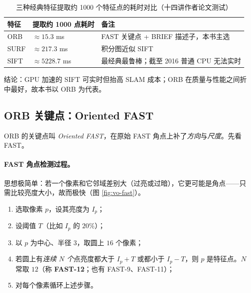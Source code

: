 \begin{table}[H]\centering\small
\caption{三种经典特征提取约 1000 个特征点的耗时对比（十四讲作者论文测试\cite{gaoxiang2019slam14}）}
\label{tab:vo-feature-time}
\begin{tabular}{lll}
\toprule
特征 & 提取约 1000 点耗时 & 备注 \\
\midrule
ORB  & $\approx 15.3$ ms & FAST 关键点 + BRIEF 描述子，本书主选 \\
SURF & $\approx 217.3$ ms & 积分图近似 SIFT \\
SIFT & $\approx 5228.7$ ms & 最经典最鲁棒；截至 2016 普通 CPU 无法实时 \\
\bottomrule
\end{tabular}
\end{table}

\noindent 结论：GPU 加速的 SIFT 可实时但抬高 SLAM 成本；ORB 在质量与性能之间折中最好，故本书以 ORB 为代表。

\subsection{ORB 关键点：Oriented FAST}
\label{sec:vo-orb-kp}

ORB 的关键点叫 \emph{Oriented FAST}，在原始 FAST 角点上补了\emph{方向}与\emph{尺度}。先看 FAST。

\paragraph{FAST 角点检测过程\cite{gaoxiang2019slam14}。}思想极简单：若一个像素和它邻域差别大（过亮或过暗），它更可能是角点——只需比较亮度大小，故而极快（图 \ref{fig:vo-fast}）。
\begin{enumerate}
  \item 选取像素 $p$，设其亮度为 $I_p$；
  \item 设阈值 $T$（比如 $I_p$ 的 $20\%$）；
  \item 以 $p$ 为中心、半径 $3$，取圆上 $16$ 个像素；
  \item 若圆上有\emph{连续 $N$ 个}点亮度都大于 $I_p+T$ 或都小于 $I_p-T$，则 $p$ 是特征点。$N$ 常取 $12$（称 \textbf{FAST-12}；也有 FAST-9、FAST-11）；
  \item 对每个像素循环上述步骤。
\end{enumerate}

